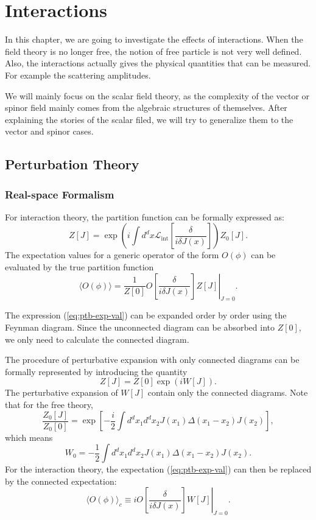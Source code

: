 
\chapter{Interactions}

In this chapter, we are going to investigate the effects of interactions.
When the field theory is no longer free, the notion of free particle is not very well defined.
Also, the interactions actually gives the physical quantities that can be measured. 
For example the scattering amplitudes.

We will mainly focus on the scalar field theory, as the complexity of the vector or spinor field mainly comes from the algebraic structures of themselves.
After explaining the stories of the scalar filed, we will try to generalize them to the vector and spinor cases.


\section{Perturbation Theory}
\subsection{Real-space Formalism}
For interaction theory, the partition function can be formally expressed as:
\begin{equation}
	Z[J] = \exp\left(i\int d^dx \mathcal{L}_{\mathrm{int}}\left[\frac{\delta}{i\delta J(x)}\right]\right)Z_0[J].
\end{equation}
The expectation values for a generic operator of the form $O(\phi)$ can be evaluated by the true partition function
\begin{equation}\label{eq:ptb-exp-val}
	\langle O(\phi)\rangle
	= \frac{1}{Z[0]} \left. O\left[\frac{\delta}{i\delta J(x)}\right] Z[J] \right|_{J=0}.
\end{equation}

The expression (\ref{eq:ptb-exp-val}) can be expanded order by order using the Feynman diagram. 
Since the unconnected diagram can be absorbed into $Z[0]$, we only need to calculate the connected diagram.

The procedure of perturbative expansion with only connected diagrams can be formally represented by introducing the quantity
\begin{equation}
	Z[J] = Z[0]\exp\left(i W[J]\right).
\end{equation}
The perturbative expansion of $W[J]$ contain only the connected diagrams.
Note that for the free theory,
\begin{equation*}
	\frac{Z_0[J]}{Z_0[0]} = \exp\left[-\frac{i}{2}\int d^d x_1 d^d x_2 J(x_1) \Delta(x_1-x_2)J(x_2)\right],
\end{equation*}
which means
\begin{equation*}
	W_0 = -\frac{1}{2}\int d^d x_1 d^d x_2 J(x_1) \Delta(x_1-x_2)J(x_2).
\end{equation*}
For the interaction theory, the expectation (\ref{eq:ptb-exp-val}) can then be replaced by the connected expectation:
\begin{equation}
	\langle O(\phi)\rangle_c
	\equiv i\left. O\left[\frac{\delta}{i\delta J(x)}\right] W[J] \right|_{J=0}.
\end{equation}


